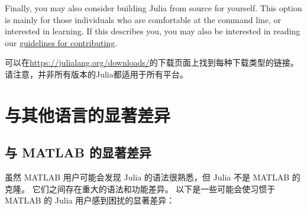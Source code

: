Finally, you may also consider building Julia from source for yourself. This option is mainly for those individuals who are comfortable at the command line, or interested in learning. If this describes you, you may also be interested in reading our \href{https://github.com/JuliaLang/julia/blob/master/CONTRIBUTING.md}{guidelines for contributing}.



可以在\href{https://julialang.org/downloads/}{https://julialang.org/downloads/}的下载页面上找到每种下载类型的链接。 请注意，并非所有版本的Julia都适用于所有平台。



\hypertarget{8132004312407744699}{}


\chapter{与其他语言的显著差异}



\hypertarget{17394269940611152566}{}


\section{与 MATLAB 的显著差异}



虽然 MATLAB 用户可能会发现 Julia 的语法很熟悉，但 Julia 不是 MATLAB 的克隆。 它们之间存在重大的语法和功能差异。 以下是一些可能会使习惯于 MATLAB 的 Julia 用户感到困扰的显著差异：



